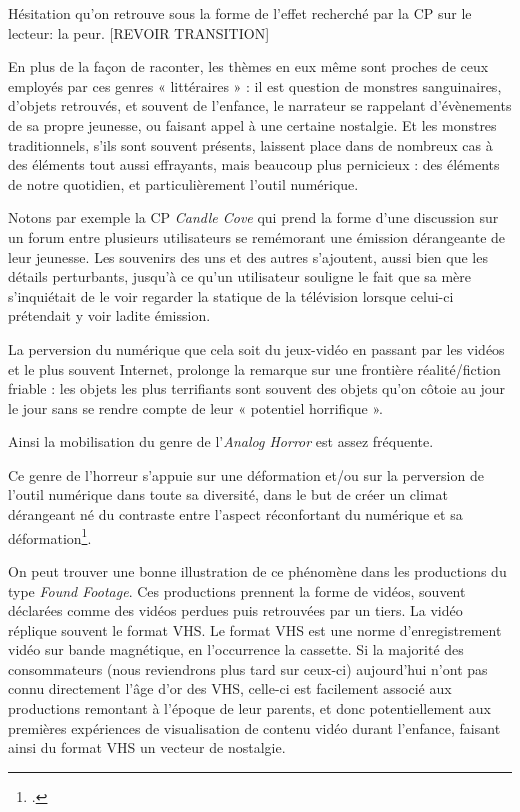 \documentclass[12pt,a4paper,oneside,titlepage]{book} %
\begin{document}
Hésitation qu'on retrouve sous la forme de l'effet recherché par la CP sur le lecteur: la peur.
[REVOIR TRANSITION]
\par
En plus de la façon de raconter, les thèmes en eux même sont proches de ceux employés par ces genres « littéraires » : il est question de monstres sanguinaires, d’objets retrouvés, et souvent de l’enfance, le narrateur se rappelant d’évènements de sa propre jeunesse, ou faisant appel à une certaine nostalgie. Et les monstres traditionnels, s’ils sont souvent présents, laissent place dans de nombreux cas à des éléments tout aussi effrayants, mais beaucoup plus pernicieux : des éléments de notre quotidien, et particulièrement l’outil numérique. 
\par
Notons par exemple la CP \emph{Candle Cove} qui prend la forme d’une discussion sur un forum entre plusieurs utilisateurs se remémorant une émission dérangeante de leur jeunesse. Les souvenirs des uns et des autres s’ajoutent, aussi bien que les détails perturbants, jusqu’à ce qu’un utilisateur souligne le fait que sa mère s’inquiétait de le voir regarder la statique de la télévision lorsque celui-ci prétendait y voir ladite émission. 
\par
La perversion du numérique que cela soit du jeux-vidéo en passant par les vidéos et le plus souvent Internet, prolonge la remarque sur une frontière réalité/fiction friable : les objets les plus terrifiants sont souvent des objets qu’on côtoie au jour le jour sans se rendre compte de leur « potentiel horrifique ».
\par
Ainsi la mobilisation du genre de l’\emph{Analog Horror }est assez fréquente. 

Ce genre de l’horreur s’appuie sur une déformation et/ou sur la perversion de l’outil numérique dans toute sa diversité, dans le but de créer un climat dérangeant né du contraste entre l’aspect réconfortant du numérique et sa déformation\footcite{balanzategui_creepypasta_2019}. 
\par
On peut trouver une bonne illustration de ce phénomène dans les productions du type \textit{Found Footage}. Ces productions prennent la forme de vidéos, souvent déclarées comme des vidéos perdues puis retrouvées par un tiers. La vidéo réplique souvent le format VHS. Le format VHS est une norme d'enregistrement vidéo sur bande magnétique, en l'occurrence la cassette. Si la majorité des consommateurs (nous reviendrons plus tard sur ceux-ci) aujourd'hui n'ont pas connu directement l'âge d'or des VHS, celle-ci est facilement associé aux productions remontant à l'époque de leur parents, et donc potentiellement aux premières expériences de visualisation de contenu vidéo durant l'enfance, faisant ainsi du format VHS un vecteur de nostalgie.
\end{document}

